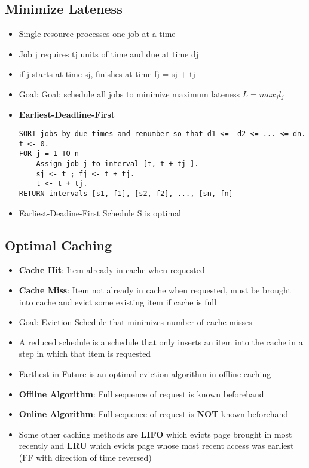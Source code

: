 \documentclass[notitlepage]{article}
\begin{document}
    \subsection{Minimize Lateness}
    \begin{itemize}
        \item Single resource processes one job at a time
        \item Job j requires tj units of time and due at time dj
        \item if j starts at time sj, finishes at time fj = sj + tj
        \item Goal: Goal: schedule all jobs to minimize maximum lateness $L=max_jl_j$
        \item \textbf{Earliest-Deadline-First}
\begin{verbatim}
SORT jobs by due times and renumber so that d1 <=  d2 <= ... <= dn.
t <- 0.
FOR j = 1 TO n
    Assign job j to interval [t, t + tj ].
    sj <- t ; fj <- t + tj.
    t <- t + tj.
RETURN intervals [s1, f1], [s2, f2], ..., [sn, fn]
\end{verbatim}
    \item Earliest-Deadine-First Schedule S is optimal 
    \end{itemize}


    \subsection{Optimal Caching}
    \begin{itemize}
        \item \textbf{Cache Hit}: Item already in cache when requested
        \item \textbf{Cache Miss}: Item not already in cache when requested, must be brought into
            cache and evict some existing item if cache is full
        \item Goal: Eviction Schedule that minimizes number of cache misses
        \item A reduced schedule is a schedule that only inserts an item into the cache in a step in which
            that item is requested
        \item Farthest-in-Future is an optimal eviction algorithm in offline caching
        \item \textbf{Offline Algorithm}: Full sequence of request is known beforehand
        \item \textbf{Online Algorithm}: Full sequence of request is \textbf{NOT} known beforehand
        \item Some other caching methods are \textbf{LIFO} which evicts page brought in most recently and
            \textbf{LRU} which evicts page whose most recent access was earliest (FF with direction of time reversed)
    \end{itemize}
    
\end{document}
